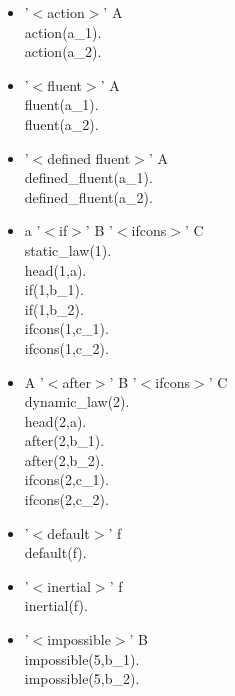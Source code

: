 \documentclass[10pt,a4paper]{article}
\begin{document}
\begin{itemize}
\item '$<$action$>$' A\\
    action(a\_1).\\
    action(a\_2).
\item '$<$fluent$>$' A\\
    fluent(a\_1).\\
    fluent(a\_2).
\item '$<$defined fluent$>$' A\\
    defined\_fluent(a\_1).\\
    defined\_fluent(a\_2).
\item a '$<$if$>$' B '$<$ifcons$>$' C\\
	static\_law(1).\\
	head(1,a).\\
	if(1,b\_1).\\
	if(1,b\_2).\\
	ifcons(1,c\_1).\\
	ifcons(1,c\_2).
\item A '$<$after$>$' B '$<$ifcons$>$' C\\
	dynamic\_law(2).\\
	head(2,a).\\
	after(2,b\_1).\\
	after(2,b\_2).\\
	ifcons(2,c\_1).\\
    ifcons(2,c\_2).
\item '$<$default$>$' f\\
	default(f).
\item '$<$inertial$>$' f\\
	inertial(f).
\item '$<$impossible$>$' B\\
	impossible(5,b\_1).\\
	impossible(5,b\_2).

\end{itemize}
\end{document}

